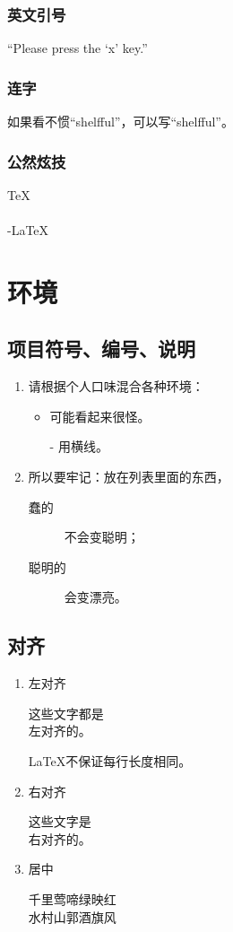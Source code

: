 \documentclass[12pt]{article}
\begin{document}
\subsubsection{英文引号}
``Please press the `x' key.''

\subsubsection{连字}
如果看不惯``shelfful''，可以写``shelf\mbox{}ful''。

\subsubsection{公然炫技}
\TeX \\
\LaTeXe \\
\AmS-\LaTeX \\

\section{环境}
\subsection{项目符号、编号、说明}
\begin{enumerate}
	\item 请根据个人口味混合各种环境：
	\begin{itemize}
		\item 可能看起来很怪。
		\item[-] 用横线。
	\end{itemize}
	\item 所以要牢记：放在列表里面的东西，
	\begin{description}
    	\item[蠢的]不会变聪明；
    	\item[聪明的]会变漂亮。
	\end{description}
\end{enumerate}

\subsection{对齐}
\begin{enumerate}
	\item 左对齐
	\begin{flushleft}
		这些文字都是\\ 左对齐的。

		\LaTeX{}不保证每行长度相同。
	\end{flushleft}
	\item 右对齐
	\begin{flushright}
		这些文字是\\ 右对齐的。
	\end{flushright}
	\item{居中}
	\begin{center}
		千里莺啼绿映红\\水村山郭酒旗风
	\end{center}
\end{enumerate}
\end{document}

